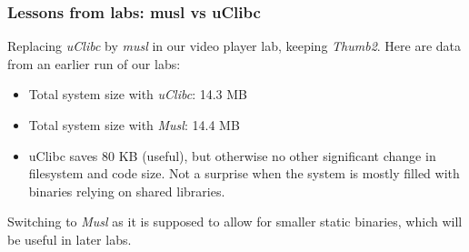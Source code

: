 \begin{frame}
\frametitle{Lessons from labs: musl vs uClibc}
Replacing {\em uClibc} by {\em musl} in our video player lab, keeping
{\em Thumb2}. Here are data from an earlier run of our labs:
\begin{itemize}
   \item Total system size with {\em uClibc}: 14.3 MB
   \item Total system size with {\em Musl}: 14.4 MB
   \item uClibc saves 80 KB (useful), but otherwise no other significant change
    in filesystem and code size. Not a surprise when the system is mostly filled
    with binaries relying on shared libraries.
\end{itemize}
Switching to {\em Musl} as it is supposed to allow for smaller static
binaries, which will be useful in later labs.
\end{frame}

